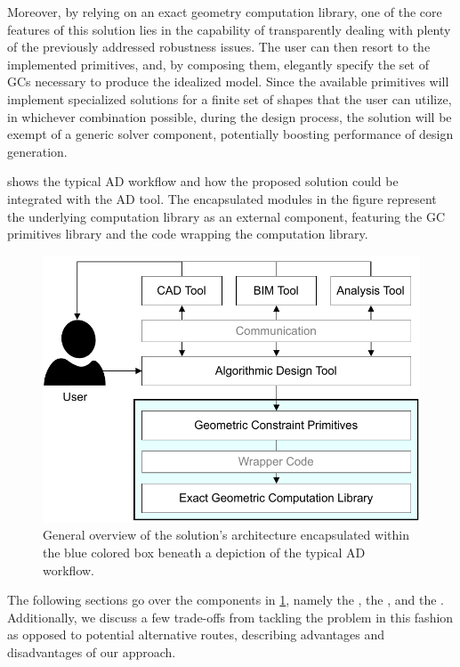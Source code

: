 Moreover, by relying on an exact geometry computation library, one of the core
features of this solution lies in the capability of transparently dealing with
plenty of the previously addressed robustness issues.  The user can then resort
to the implemented primitives, and, by composing them, elegantly specify the set
of \acp{GC} necessary to produce the idealized model.  Since the available
primitives will implement specialized solutions for a finite set of shapes that
the user can utilize, in whichever combination possible, during the design
process, the solution will be exempt of a generic solver component, potentially
boosting performance of design generation.

 shows the typical \ac{AD} workflow and how the proposed
solution could be integrated with the \ac{AD} tool.  The encapsulated modules in
the figure represent the underlying computation library as an external
component, featuring the \ac{GC} primitives library and the code wrapping the
computation library.

\begin{figure}[htb]
  \includegraphics[width=\textwidth]{fig/solution-arch}
  \caption[Solution architecture within the AD workflow]{
    General overview of the solution's architecture encapsulated within the
    blue colored box beneath a depiction of the typical \ac{AD} workflow.}%
  \label{fig:solution.arch}
\end{figure}

The following sections go over the components in \cref{fig:solution.arch},
namely the \geomlibrary{}, the \wrapper{}, and the \primitives{}.  Additionally,
we discuss a few trade-offs from tackling the problem in this fashion as opposed
to potential alternative routes, describing advantages and disadvantages of our
approach.



